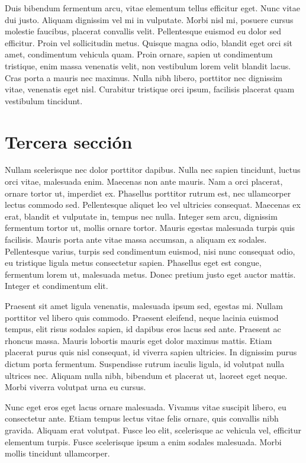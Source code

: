 Duis bibendum fermentum arcu, vitae elementum tellus efficitur eget. Nunc vitae dui justo. Aliquam dignissim vel mi in vulputate. Morbi nisl mi, posuere cursus molestie faucibus, placerat convallis velit. Pellentesque euismod eu dolor sed efficitur. Proin vel sollicitudin metus. Quisque magna odio, blandit eget orci sit amet, condimentum vehicula quam. Proin ornare, sapien ut condimentum tristique, enim massa venenatis velit, non vestibulum lorem velit blandit lacus. Cras porta a mauris nec maximus. Nulla nibh libero, porttitor nec dignissim vitae, venenatis eget nisl. Curabitur tristique orci ipsum, facilisis placerat quam vestibulum tincidunt.

\section{Tercera sección}

Nullam scelerisque nec dolor porttitor dapibus. Nulla nec sapien tincidunt, luctus orci vitae, malesuada enim. Maecenas non ante mauris. Nam a orci placerat, ornare tortor ut, imperdiet ex. Phasellus porttitor rutrum est, nec ullamcorper lectus commodo sed. Pellentesque aliquet leo vel ultricies consequat. Maecenas ex erat, blandit et vulputate in, tempus nec nulla. Integer sem arcu, dignissim fermentum tortor ut, mollis ornare tortor. Mauris egestas malesuada turpis quis facilisis. Mauris porta ante vitae massa accumsan, a aliquam ex sodales. Pellentesque varius, turpis sed condimentum euismod, nisi nunc consequat odio, eu tristique ligula metus consectetur sapien. Phasellus eget est congue, fermentum lorem ut, malesuada metus. Donec pretium justo eget auctor mattis. Integer et condimentum elit.

Praesent sit amet ligula venenatis, malesuada ipsum sed, egestas mi. Nullam porttitor vel libero quis commodo. Praesent eleifend, neque lacinia euismod tempus, elit risus sodales sapien, id dapibus eros lacus sed ante. Praesent ac rhoncus massa. Mauris lobortis mauris eget dolor maximus mattis. Etiam placerat purus quis nisl consequat, id viverra sapien ultricies. In dignissim purus dictum porta fermentum. Suspendisse rutrum iaculis ligula, id volutpat nulla ultrices nec. Aliquam nulla nibh, bibendum et placerat ut, laoreet eget neque. Morbi viverra volutpat urna eu cursus.

Nunc eget eros eget lacus ornare malesuada. Vivamus vitae suscipit libero, eu consectetur ante. Etiam tempus lectus vitae felis ornare, quis convallis nibh gravida. Aliquam erat volutpat. Fusce leo elit, scelerisque ac vehicula vel, efficitur elementum turpis. Fusce scelerisque ipsum a enim sodales malesuada. Morbi mollis tincidunt ullamcorper.

